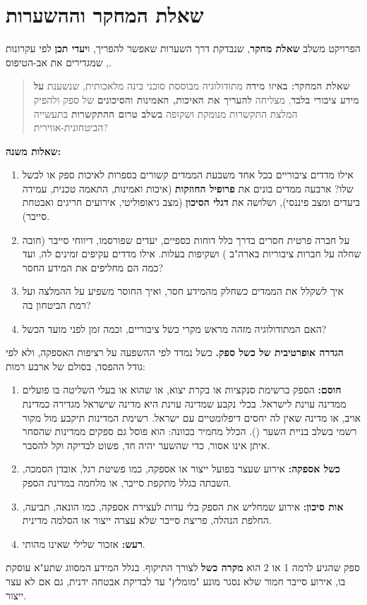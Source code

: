 \section{שאלת המחקר וההשערות}

הפרויקט משלב \textbf{שאלת מחקר}, שנבדקת דרך השערות שאפשר להפריך, ו\textbf{יעדי תכן} לפי עקרונות , שמגדירים את אב-הטיפוס.

\begin{quote}
\textbf{שאלת המחקר: באיזו מידה} מתודולוגיה מבוססת סוכני בינה מלאכותית, שנשענת \textbf{על מידע ציבורי בלבד}, מצליחה \textbf{להעריך את האיכות, האמינות והסיכונים} של ספק ולהפיק המלצת התקשרות מנומקת ושקופה \textbf{בשלב טרום ההתקשרות} בתעשייה הביטחונית-אווירית?
\end{quote}

\textbf{שאלות משנה:}
\begin{enumerate}
\item אילו מדדים ציבוריים בכל אחד משבעת הממדים קשורים בספרות לאיכות ספק או לכשל שלו? ארבעה ממדים בונים את \textbf{פרופיל החוזקות} (איכות ואמינות, התאמה טכנית, עמידה ביעדים ומצב פיננסי), ושלושה את \textbf{דגלי הסיכון} (מצב גיאופוליטי, אירועים חריגים ואבטחת סייבר).
\item על חברה פרטית חסרים בדרך כלל דוחות כספיים, יעדים שפורסמו, דיווחי סייבר (חובה שחלה על חברות ציבוריות בארה"ב \cite{sec2023}) ושקיפות בעלות. אילו מדדים עקיפים זמינים לה, ועד כמה הם מחליפים את המידע החסר?
\item איך לשקלל את הממדים כשחלק מהמידע חסר, ואיך החוסר משפיע על ההמלצה ועל רמת הביטחון בה?
\item האם המתודולוגיה מזהה מראש מקרי כשל ציבוריים, וכמה זמן לפני מועד הכשל?
\end{enumerate}

\textbf{הגדרה אופרטיבית של כשל ספק.} כשל נמדד לפי ההשפעה על רציפות האספקה, ולא לפי גודל ההפסד, בסולם של ארבע רמות:
\begin{enumerate}
\item \textbf{חוסם:} הספק ברשימת סנקציות או בקרת יצוא, או שהוא או בעלי השליטה בו פועלים ממדינה עוינת לישראל. בכלי נקבע שמדינה עוינת היא מדינה שישראל מגדירה כמדינת אויב, או מדינה שאין לה יחסים דיפלומטיים עם ישראל. רשימת המדינות תיקבע מול מקור רשמי בשלב בניית השער (). הכלל מחמיר בכוונה: הוא פוסל גם ספקים ממדינות שהסחר איתן אינו אסור, כדי שהשער יהיה חד, פשוט לבדיקה וקל להסבר.
\item \textbf{כשל אספקה:} אירוע שעצר בפועל ייצור או אספקה, כמו פשיטת רגל, אובדן הסמכה, השבתה בגלל מתקפת סייבר, או מלחמה במדינת הספק.
\item \textbf{אות סיכון:} אירוע שמחליש את הספק בלי עדות לעצירת אספקה, כמו הונאה, תביעה, החלפת הנהלה, פריצת סייבר שלא עצרה ייצור או הסלמה מדינית.
\item \textbf{רעש:} אזכור שלילי שאינו מהותי.
\end{enumerate}
ספק שהגיע לרמה 1 או 2 הוא \textbf{מקרה כשל} לצורך התיקוף. בגלל המידע המסווג שתע"א עוסקת בו, אירוע סייבר חמור שלא נסגר מונע "מומלץ" עד לבדיקת אבטחה ידנית, גם אם לא עצר ייצור.

